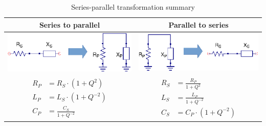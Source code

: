 \begin{table}[H]
  \centering
  \begin{tabular}{ | c | c | }
    \hline
    Series to parallel & Parallel to series\\ \hline
    \begin{minipage}{.4\textwidth}
      \includegraphics[width=\linewidth]{Series_to_parallel}
    \end{minipage}
    &
    \begin{minipage}{.4\textwidth}
      \includegraphics[width=\linewidth]{Parallel_to_series}
    \end{minipage}
    \\ \hline
    \begin{minipage}{.4\textwidth}
         {\begin{align}
           R_P &= R_S \cdot (1 + Q^2)\\
           L_P &= L_S \cdot (1 + Q^{-2})\\
           C_P &= \frac{C_S}{1 + Q^{-2}}
         \end{align}}
    \end{minipage}
    &
        \begin{minipage}{.4\textwidth}
         {\begin{align}
           R_S &= \frac{R_P}{1 + Q^2}\\
           L_S &= \frac{L_P}{1 + Q^{-2}}\\
           C_S &= C_P \cdot (1 + Q^{-2})
         \end{align}}
    \end{minipage}
    \\ \hline
  \end{tabular}
  \caption{Series-parallel transformation summary}
  \label{tbl:Qtrans_summary}
\end{table}


